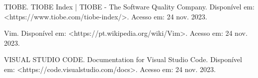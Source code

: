 \documentclass[a4paper,12pt]{article}
\begin{document}
\noindent TIOBE. TIOBE Index | TIOBE - The Software Quality Company. Disponível em: <https://www.tiobe.com/tiobe-index/>. Acesso em: 24 nov. 2023. \linebreak

\noindent Vim. Disponível em: <https://pt.wikipedia.org/wiki/Vim>. Acesso em: 24 nov. 2023. \linebreak

\noindent VISUAL STUDIO CODE. Documentation for Visual Studio Code. Disponível em: <https://code.visualstudio.com/docs>. Acesso em: 24 nov. 2023. \linebreak

\noindent 

\noindent

\end{document}
